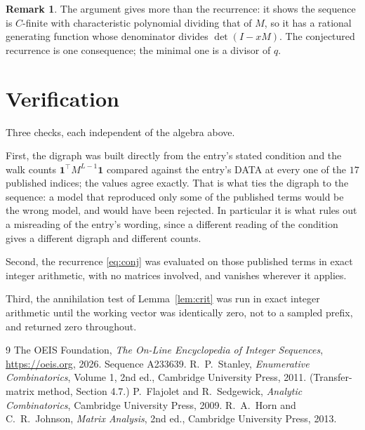 \documentclass[11pt,a4paper]{article}
\theoremstyle{plain}
\theoremstyle{definition}
\newtheorem{remark}[theorem]{Remark}
\begin{document}
\begin{remark}
The argument gives more than the recurrence: it shows the sequence is $C$-finite with
characteristic polynomial dividing that of $M$, so it has a rational generating function
whose denominator divides $\det(I-xM)$. The conjectured recurrence is one consequence; the
minimal one is a divisor of $q$.
\end{remark}

\section{Verification}

Three checks, each independent of the algebra above.

First, the digraph was built directly from the entry's stated condition and the walk counts
$\mathbf{1}^{\!\top}M^{L-1}\mathbf{1}$ compared against the entry's DATA at
every one of the $17$ published indices; the values agree exactly. That is what ties
the digraph to the sequence: a model that reproduced only some of the published terms would
be the wrong model, and would have been rejected. In particular it is what rules out a
misreading of the entry's wording, since a different reading of the condition gives a
different digraph and different counts.

Second, the recurrence \eqref{eq:conj} was evaluated on those published terms in exact
integer arithmetic, with no matrices involved, and vanishes wherever it applies.

Third, the annihilation test of Lemma~\ref{lem:crit} was run in exact integer arithmetic
until the working vector was identically zero, not to a sampled prefix, and returned zero
throughout.

\begin{thebibliography}{9}
 The OEIS Foundation, \emph{The On-Line Encyclopedia of Integer
Sequences}, \url{https://oeis.org}, 2026. Sequence A233639.
 R.~P.~Stanley, \emph{Enumerative Combinatorics}, Volume 1, 2nd ed.,
Cambridge University Press, 2011. (Transfer-matrix method, Section 4.7.)
 P.~Flajolet and R.~Sedgewick, \emph{Analytic Combinatorics}, Cambridge
University Press, 2009.
 R.~A.~Horn and C.~R.~Johnson, \emph{Matrix Analysis}, 2nd ed., Cambridge
University Press, 2013.
\end{thebibliography}
\end{document}
